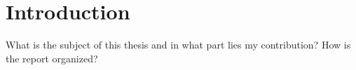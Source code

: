 \chapter*{Introduction}
What is the subject of this thesis and in what part lies my 
contribution?
How is the report organized?

\lipsum[1]
